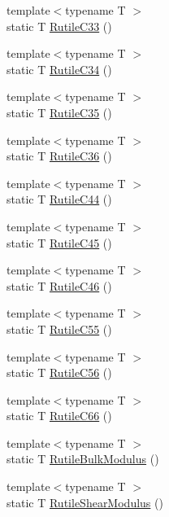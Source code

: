 \begin{DoxyCompactItemize}
\item 
{\footnotesize template$<$typename T $>$ }\\static T \mbox{\hyperlink{namespacempc_1_1data_ad16f8f99ef36895422dadeb665fba36c}{Rutile\+C33}} ()
\item 
{\footnotesize template$<$typename T $>$ }\\static T \mbox{\hyperlink{namespacempc_1_1data_ab349fdb95b36e7172d9b818639f2a05b}{Rutile\+C34}} ()
\item 
{\footnotesize template$<$typename T $>$ }\\static T \mbox{\hyperlink{namespacempc_1_1data_ae851e6cf72f83d8a81da78106739f08e}{Rutile\+C35}} ()
\item 
{\footnotesize template$<$typename T $>$ }\\static T \mbox{\hyperlink{namespacempc_1_1data_a6e78b25df55c012aaf7b06a51d2e19a5}{Rutile\+C36}} ()
\item 
{\footnotesize template$<$typename T $>$ }\\static T \mbox{\hyperlink{namespacempc_1_1data_a15ad086ad32c57f2b0a183fa5e2862a9}{Rutile\+C44}} ()
\item 
{\footnotesize template$<$typename T $>$ }\\static T \mbox{\hyperlink{namespacempc_1_1data_a661875b8e0da7aaf617550f0e8372496}{Rutile\+C45}} ()
\item 
{\footnotesize template$<$typename T $>$ }\\static T \mbox{\hyperlink{namespacempc_1_1data_a0bf3a2fccba3836ebfa989a7a3b9253e}{Rutile\+C46}} ()
\item 
{\footnotesize template$<$typename T $>$ }\\static T \mbox{\hyperlink{namespacempc_1_1data_ab80b29a11309fa245e2cda8ca5c3f84b}{Rutile\+C55}} ()
\item 
{\footnotesize template$<$typename T $>$ }\\static T \mbox{\hyperlink{namespacempc_1_1data_a59ba4d5824804f692a722b8655320224}{Rutile\+C56}} ()
\item 
{\footnotesize template$<$typename T $>$ }\\static T \mbox{\hyperlink{namespacempc_1_1data_a77467c92adbc3862d67ecd94105493dc}{Rutile\+C66}} ()
\item 
{\footnotesize template$<$typename T $>$ }\\static T \mbox{\hyperlink{namespacempc_1_1data_aa35acd7fdbe35e4b9d5f2654ab82985f}{Rutile\+Bulk\+Modulus}} ()
\item 
{\footnotesize template$<$typename T $>$ }\\static T \mbox{\hyperlink{namespacempc_1_1data_ad81e8700e9875c885bc02c71de324534}{Rutile\+Shear\+Modulus}} ()

\end{DoxyCompactItemize}
